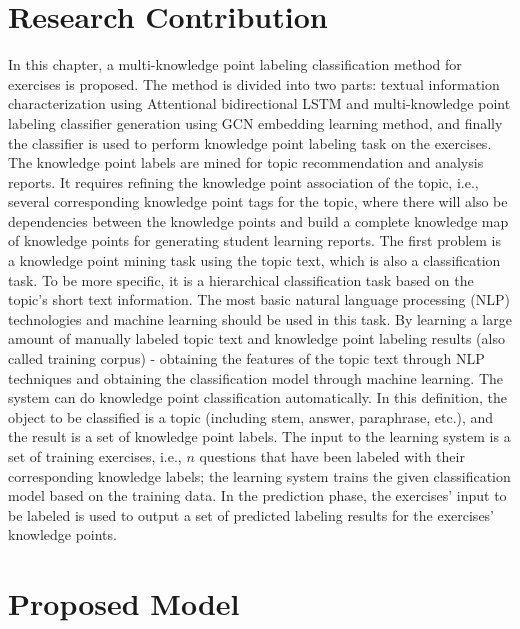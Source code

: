 \section{Research Contribution}
In this chapter, a multi-knowledge point labeling classification method for exercises is proposed. The method is divided into two parts: textual information characterization using Attentional bidirectional LSTM and multi-knowledge point labeling classifier generation using GCN embedding learning method, and finally the classifier is used to perform knowledge point labeling task on the exercises. The knowledge point labels are mined for topic recommendation and analysis reports. It requires refining the knowledge point association of the topic, i.e., several corresponding knowledge point tags for the topic, where there will also be dependencies between the knowledge points and build a complete knowledge map of knowledge points for generating student learning reports. The first problem is a knowledge point mining task using the topic text, which is also a classification task. To be more specific, it is a hierarchical classification task based on the topic's short text information. The most basic natural language processing (NLP) technologies and machine learning should be used in this task. By learning a large amount of manually labeled topic text and knowledge point labeling results (also called training corpus) - obtaining the features of the topic text through NLP techniques and obtaining the classification model through machine learning. The system can do knowledge point classification automatically. In this definition, the object to be classified is a topic (including stem, answer, paraphrase, etc.), and the result is a set of knowledge point labels. The input to the learning system is a set of training exercises, i.e., \(n\) questions that have been labeled with their corresponding knowledge labels; the learning system trains the given classification model based on the training data. In the prediction phase, the exercises' input to be labeled is used to output a set of predicted labeling results for the exercises' knowledge points.

\section{Proposed Model}

